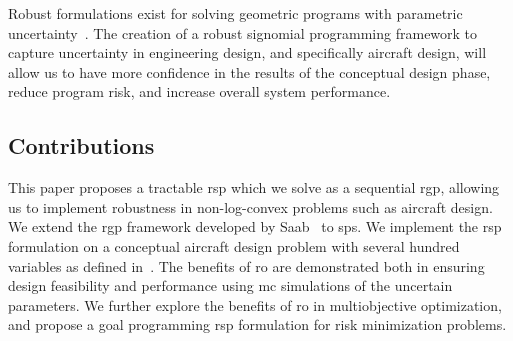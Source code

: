 Robust formulations exist for solving geometric programs with parametric uncertainty~\cite{Saab2018}.
The creation of a robust signomial programming framework to capture uncertainty in engineering
design, and specifically aircraft design, will allow us to have more confidence in the results
of the conceptual design phase, reduce program risk, and increase overall system performance.

\subsection{Contributions}

This paper proposes a tractable \gls{rsp} which we solve as a sequential \gls{rgp},
allowing us to implement robustness in non-log-convex problems such as aircraft design.
We extend the \gls{rgp} framework developed by Saab~\cite{Saab2018} to \gls{sp}s.
We implement the \gls{rsp} formulation on a conceptual aircraft design problem with several hundred
variables as defined in~\cite{Ozturk2018}.
The benefits of \gls{ro} are demonstrated both in ensuring design feasibility and performance
using \gls{mc} simulations of the uncertain parameters.
We further explore the benefits of \gls{ro} in multiobjective optimization, and propose
a goal programming \gls{rsp} formulation for risk minimization problems.


